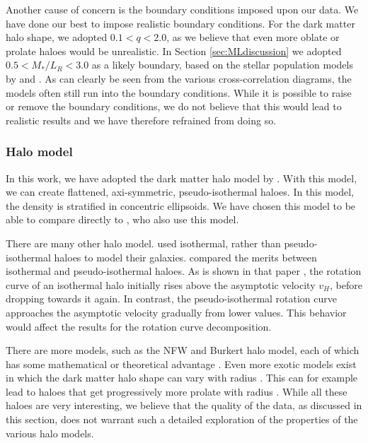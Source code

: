 \documentclass[useAMS,usenatbib]{mn2e}
\begin{document}
Another cause of concern is the boundary conditions imposed upon our data. 
We have done our best to impose realistic boundary conditions.
For the dark matter halo shape, we adopted $0.1<q<2.0$, as we believe that 
even more oblate or prolate haloes would be unrealistic.
In Section \ref{sec:MLdiscussion} we adopted $0.5<M_*/L_R<3.0$ as a likely 
boundary, based on the 
stellar population models by \citet{Worthey1994A} and \citet{Bertelli1994A}.
As can clearly be seen from the various cross-correlation diagrams, the 
models often still run into the boundary conditions.
While it is possible to raise or remove the boundary conditions, we do not 
believe that this would lead to realistic results and we have therefore 
refrained from doing so. 
 

\subsubsection{Halo model}
In this work, we have adopted the dark matter halo model by 
\citet{Sackett1994A}.
With this model, we can create  flattened, axi-symmetric, 
pseudo-isothermal haloes. 
In this model, the density is stratified in concentric ellipsoids.
We have chosen this model to be able to compare directly 
to \citet{OBrien2010D}, who also use this model.

There are many other halo model. 
\citet{Carignan1985, Carignan1988} used isothermal, rather 
than pseudo-isothermal haloes to model their galaxies.
\citet{Kormendy2004IAU} compared the merits between isothermal 
and pseudo-isothermal haloes. 
As is shown in that paper 
\citep[and reproduced in][]{OBrien2010D}, the rotation curve 
of an isothermal halo initially rises above the asymptotic 
velocity $v_H$, before dropping towards it again.
In contrast, the pseudo-isothermal rotation curve approaches 
the asymptotic velocity gradually from lower values.
This behavior would affect the results for the rotation 
curve decomposition.

There are more models, such as the NFW and Burkert halo model, 
each of which has some mathematical or theoretical advantage 
\citep{Burkert1995,Navarro1996}.
Even more exotic models exist in which the dark matter halo shape 
can vary with radius \citep{VeraCiro2013}. 
This can for example lead to haloes that get progressively more prolate 
with radius \citep{Banerjee2011A}.
While all these haloes are very interesting, we believe that the quality 
of the data, as discussed in this section, does not warrant such a 
detailed exploration of the properties of the various halo models. 
\end{document}
